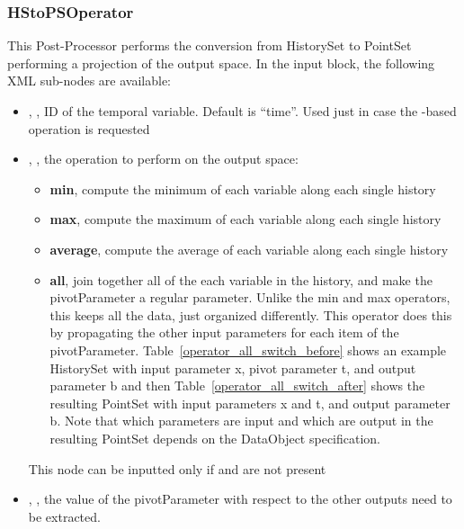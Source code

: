 \subsubsection{HStoPSOperator}
\label{HStoPSOperator}

This Post-Processor performs the conversion from HistorySet to PointSet performing a projection of the output space.
In the  input block, the following XML sub-nodes are available:

\begin{itemize}
   \item {}, , ID of the temporal variable. Default is ``time''.
   \nb Used just in case the  -based operation  is requested
    \item {}, , the operation to perform on the output space:
      \begin{itemize}
        \item \textbf{min}, compute the minimum of each variable along each single history
         \item \textbf{max}, compute the maximum of each variable along each single history
         \item \textbf{average}, compute the average of each variable along each single history
         \item \textbf{all}, join together all of the each variable in
           the history, and make the pivotParameter a regular
           parameter.  Unlike the min and max operators, this keeps
           all the data, just organized differently. This operator
           does this by propagating the other input parameters for
           each item of the pivotParameter.
           Table~\ref{operator_all_switch_before} shows an example
           HistorySet with input parameter x, pivot parameter t, and
           output parameter b and then
           Table~\ref{operator_all_switch_after} shows the resulting
           PointSet with input parameters x and t, and output
           parameter b. Note that which parameters are input and which
           are output in the resulting PointSet depends on the
           DataObject specification.
       \end{itemize}
        \nb This node can be inputted only if  and  are not present
     \item {}, , the value of the pivotParameter with respect to the other outputs need to be extracted.

\end{itemize}
